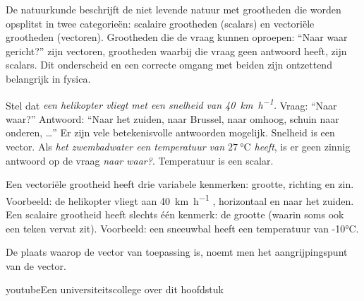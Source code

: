 \documentclass{ximera}
\begin{document}
	\author{Bart Lambregs}
    \xmsource\xmuitleg


De natuurkunde beschrijft de niet levende natuur met grootheden die worden opsplitst in twee categorieën: scalaire grootheden (scalars) en vectoriële grootheden (vectoren). 
Grootheden die de vraag kunnen oproepen: “Naar waar gericht?” zijn vectoren, grootheden waarbij die vraag geen antwoord heeft, zijn scalars. 
Dit onderscheid en een correcte omgang met beiden zijn ontzettend belangrijk in fysica.


Stel dat \textit{een helikopter vliegt met een snelheid van \SI{40}{\kilo\meter\per\hour}.} 
Vraag: “Naar waar?” Antwoord: “Naar het zuiden, naar Brussel, naar omhoog, schuin naar onderen, …” 
Er zijn vele betekenisvolle antwoorden mogelijk. 
Snelheid is een vector. 
Als \textit{het zwembadwater een temperatuur van  \(\SI{27}{\celsius}\) heeft}, is er geen zinnig antwoord op de vraag \textit{naar waar?}. 
Temperatuur is een scalar.



Een vectoriële grootheid heeft drie variabele kenmerken: grootte, richting en zin. Voorbeeld: de helikopter vliegt aan \SI{40}{\kilo\meter\per\hour} , horizontaal en naar het zuiden. 
Een scalaire grootheid heeft slechts één kenmerk: de grootte (waarin soms ook een teken vervat zit). 
Voorbeeld: een sneeuwbal heeft een temperatuur van -10°C.

De plaats waarop de vector van toepassing is, noemt men het aangrijpingspunt van de vector.

\begin{expandable}{youtube}{Een universiteitscollege over dit hoofdstuk}
\end{expandable}





	
\end{document}
